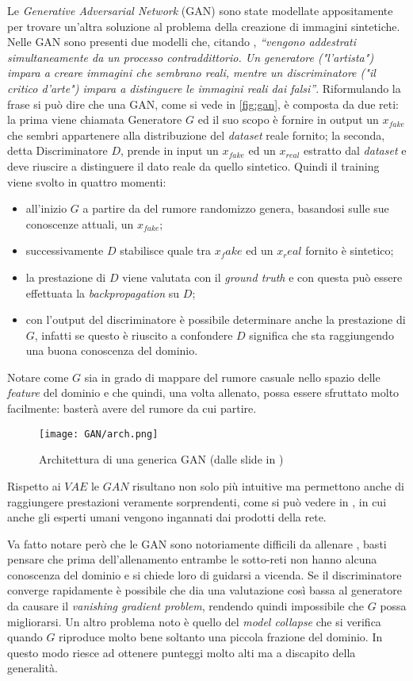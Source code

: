 Le \emph{Generative Adversarial Network} (GAN) sono state modellate appositamente per trovare un'altra soluzione al problema della creazione di immagini sintetiche.
Nelle GAN sono presenti due modelli che, citando \cite{GANTF}, \emph{``vengono addestrati simultaneamente da un processo contraddittorio. Un generatore ("l'artista") impara a creare immagini che sembrano reali, mentre un discriminatore ("il critico d'arte") impara a distinguere le immagini reali dai falsi''}.
Riformulando la frase si può dire che una GAN, come si vede in \autoref{fig:gan}, è composta da due reti: la prima viene chiamata Generatore $G$ ed il suo scopo è fornire in output un $x_{fake}$ che sembri appartenere alla distribuzione del \emph{dataset} reale fornito; la seconda, detta Discriminatore $D$, prende in input un $x_{fake}$ ed un $x_{real}$ estratto dal \emph{dataset} e deve riuscire a distinguere il dato reale da quello sintetico.
Quindi il training viene svolto in quattro momenti:
\begin{itemize}
  \item all'inizio $G$ a partire da del rumore randomizzo genera, basandosi sulle sue conoscenze attuali, un $x_{fake}$;
  \item successivamente $D$ stabilisce quale tra $x_fake$ ed un $x_real$ fornito è sintetico;
  \item la prestazione di $D$ viene valutata con il \emph{ground truth} e con questa può essere effettuata la \emph{backpropagation} su $D$;
  \item con l'output del discriminatore è possibile determinare anche la prestazione di $G$, infatti se questo è riuscito a confondere $D$ significa che sta raggiungendo una buona conoscenza del dominio.
\end{itemize}
Notare come $G$ sia in grado di mappare del rumore casuale nello spazio delle \emph{feature} del dominio e che quindi, una volta allenato, possa essere sfruttato molto facilmente: basterà avere del rumore da cui partire.
\begin{figure}[ht]
  \centering
  \texttt{[image: GAN/arch.png]}
  \caption{Architettura di una generica GAN (dalle slide in \cite{MIT_GEN})}
  \label{fig:gan}
\end{figure}
Rispetto ai $VAE$ le $GAN$ risultano non solo più intuitive ma permettono anche di raggiungere prestazioni veramente sorprendenti, come si può vedere in \cite{GAN_HD}, in cui anche gli esperti umani vengono ingannati dai prodotti della rete.

Va fatto notare però che le GAN sono notoriamente difficili da allenare %
, basti pensare che prima dell'allenamento entrambe le sotto-reti non hanno alcuna conoscenza del dominio e si chiede loro di guidarsi a vicenda.
Se il discriminatore converge rapidamente è possibile che dia una valutazione così bassa al generatore da causare il \emph{vanishing gradient problem}, rendendo quindi impossibile che $G$ possa migliorarsi.
Un altro problema noto è quello del \emph{model collapse} che si verifica quando $G$ riproduce molto bene soltanto una piccola frazione del dominio.
In questo modo riesce ad ottenere punteggi molto alti ma a discapito della generalità.


